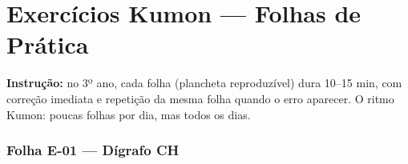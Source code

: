 
\chapter{Exercícios Kumon --- Folhas de Prática}

\textbf{Instrução:} no 3º ano, cada folha (plancheta reproduzível) dura 10–15 min, com correção imediata e repetição da mesma folha quando o erro aparecer. O ritmo Kumon: poucas folhas por dia, mas todos os dias.



\subsection{Folha E-01 --- Dígrafo CH}
